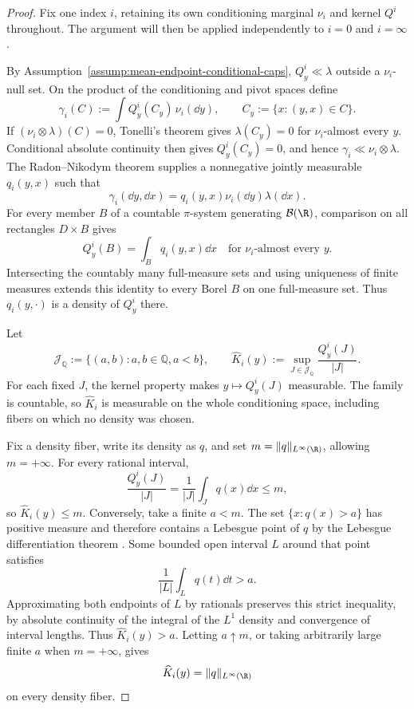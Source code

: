 \begin{proof}
Fix one index $i$, retaining its own conditioning marginal $\nu_i$ and
kernel $Q^i$ throughout.  The argument will then be applied independently to
$i=0$ and $i=\infty$.

By Assumption~\ref{assump:mean-endpoint-conditional-caps}, $Q^i_y\ll\lambda$
outside a $\nu_i$-null set.  On the product of the conditioning and pivot
spaces define
\[
\gamma_i(C):=\int Q^i_y(C_y)\,\nu_i(\dd y),
\qquad C_y:=\{x:(y,x)\in C\}.
\]
If $(\nu_i\otimes\lambda)(C)=0$, Tonelli's theorem
\cite[Theorem~2.37]{Folland1999} gives
$\lambda(C_y)=0$ for $\nu_i$-almost every $y$.  Conditional absolute
continuity then gives $Q^i_y(C_y)=0$, and hence
$\gamma_i\ll\nu_i\otimes\lambda$.  The Radon--Nikodym theorem
\cite[Theorem~3.8]{Folland1999} supplies a
nonnegative jointly measurable $q_i(y,x)$ such that
\[
\gamma_i(\dd y,\dd x)=q_i(y,x)\nu_i(\dd y)\lambda(\dd x).
\]
For every member $B$ of a countable $\pi$-system generating
$\mathcal B(\R)$, comparison on all rectangles $D\times B$ gives
\[
Q^i_y(B)=\int_Bq_i(y,x)\dd x
\quad\text{for $\nu_i$-almost every $y$}.
\]
Intersecting the countably many full-measure sets and using uniqueness of
finite measures \cite[Lemma~1.1]{Kallenberg2002} extends this identity to every Borel $B$ on one full-measure
set.  Thus $q_i(y,\cdot)$ is a density of $Q^i_y$ there.

Let
\[
\mathscr J_{\mathbb Q}:=\{(a,b):a,b\in\mathbb Q, a<b\},
\qquad
\widehat K_i(y):=\sup_{J\in\mathscr J_{\mathbb Q}}
\frac{Q^i_y(J)}{|J|}.
\]
For each fixed $J$, the kernel property makes $y\mapsto Q^i_y(J)$
measurable.  The family is countable, so $\widehat K_i$ is measurable on the
whole conditioning space, including fibers on which no density was chosen.

Fix a density fiber, write its density as $q$, and set
$m=\|q\|_{L^\infty(\R)}$, allowing $m=+\infty$.  For every rational interval,
\[
\frac{Q^i_y(J)}{|J|}=\frac1{|J|}\int_Jq(x)\dd x\leq m,
\]
so $\widehat K_i(y)\leq m$.  Conversely, take a finite $a<m$.  The set
$\{x:q(x)>a\}$ has positive measure and therefore contains a Lebesgue point
of $q$ by the Lebesgue differentiation theorem
\cite[Theorem~3.21]{Folland1999}.  Some bounded open interval $L$ around that point satisfies
\[
\frac1{|L|}\int_Lq(t)\dd t>a.
\]
Approximating both endpoints of $L$ by rationals preserves this strict
inequality, by absolute continuity of the integral of the $L^1$ density
\cite[Proposition~2.23]{Folland1999} and convergence of interval lengths.  Thus
$\widehat K_i(y)>a$.  Letting
$a\uparrow m$, or taking arbitrarily large finite $a$ when $m=+\infty$, gives
\begin{equation}
\widehat K_i(y)=\|q\|_{L^\infty(\R)}
\label{eq:rational-cap-identity}
\end{equation}
on every density fiber.


\end{proof}
